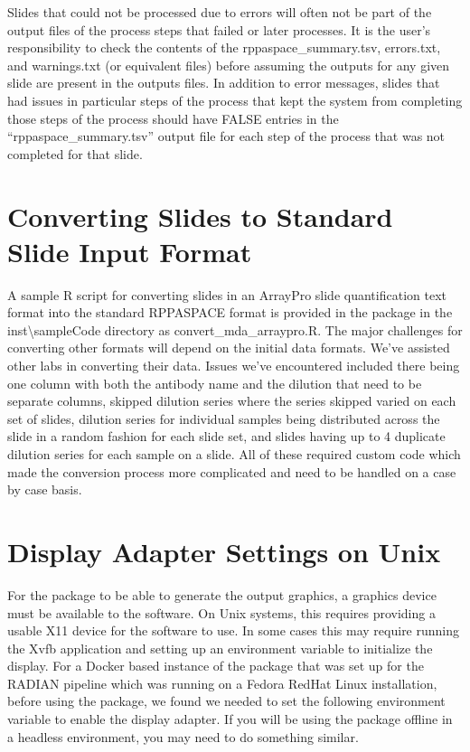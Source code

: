 \documentclass[
]{article}
\begin{document}
Slides that could not be processed due to errors will often not be part
of the output files of the process steps that failed or later processes.
It is the user's responsibility to check the contents of the
rppaspace\_summary.tsv, errors.txt, and warnings.txt (or equivalent
files) before assuming the outputs for any given slide are present in
the outputs files. In addition to error messages, slides that had issues
in particular steps of the process that kept the system from completing
those steps of the process should have FALSE entries in the
``rppaspace\_summary.tsv'' output file for each step of the process that
was not completed for that slide.

\hypertarget{converting}{%
\section{Converting Slides to Standard Slide Input
Format}\label{converting}}

A sample R script for converting slides in an ArrayPro slide
quantification text format into the standard RPPASPACE format is
provided in the package in the inst\textbackslash sampleCode directory
as convert\_mda\_arraypro.R. The major challenges for converting other
formats will depend on the initial data formats. We've assisted other
labs in converting their data. Issues we've encountered included there
being one column with both the antibody name and the dilution that need
to be separate columns, skipped dilution series where the series skipped
varied on each set of slides, dilution series for individual samples
being distributed across the slide in a random fashion for each slide
set, and slides having up to 4 duplicate dilution series for each sample
on a slide. All of these required custom code which made the conversion
process more complicated and need to be handled on a case by case basis.

\hypertarget{unix}{%
\section{Display Adapter Settings on Unix}\label{unix}}

For the package to be able to generate the output graphics, a graphics
device must be available to the software. On Unix systems, this requires
providing a usable X11 device for the software to use. In some cases
this may require running the Xvfb application and setting up an
environment variable to initialize the display. For a Docker based
instance of the package that was set up for the RADIAN pipeline which
was running on a Fedora RedHat Linux installation, before using the
package, we found we needed to set the following environment variable to
enable the display adapter. If you will be using the package offline in
a headless environment, you may need to do something similar.
\end{document}
